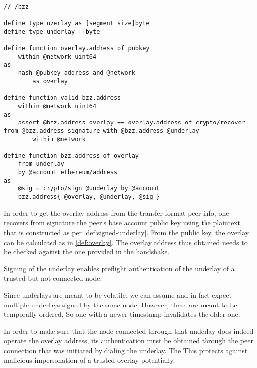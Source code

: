 \begin{definition}\label{def:bzz-types}
\begin{lstlisting}[language=buzz1]
// /bzz

define type overlay as [segment size]byte
define type underlay []byte

define function overlay.address of pubkey 
    within @network uint64 
as
    hash @pubkey address and @network 
        as overlay

define function valid bzz.address 
    within @network uint64
as
    assert @bzz.address overlay == overlay.address of crypto/recover from @bzz.address signature with @bzz.address @underlay
        within @network
        
define function bzz.address of overlay
    from underlay 
    by @account ethereum/address
as
    @sig = crypto/sign @underlay by @account
    bzz.address{ @overlay, @underlay, @sig }

\end{lstlisting}
\end{definition}




In order to get the overlay address from the transfer format peer info, one recovers from signature the peer's base account public key using the plaintext that is constructed as per \ref{def:signed-underlay}. From the public key, the overlay can be calculated as in \ref{def:overlay}. The overlay address thus obtained needs to be checked against the one provided in the handshake.

Signing of the underlay enables preflight authentication of the underlay of a trusted but not connected node. 

Since underlays are meant to be volatile, we can assume and in fact expect multiple underlays signed by the same node. However, these are meant to be temporally ordered. So one with a newer timestamp invalidates the older one. 

In order to make sure that the node connected through that underlay does indeed operate the overlay address, its authentication must be obtained through the peer connection that was initiated by dialing the underlay. The This protects against malicious impersonation of a trusted overlay potentially. 